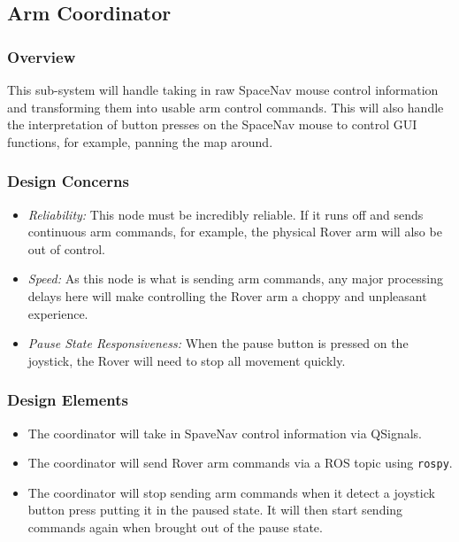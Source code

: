 \subsection{Arm Coordinator}
\subsubsection{Overview}
This sub-system will handle taking in raw SpaceNav mouse control information and transforming them into usable arm control commands.
This will also handle the interpretation of button presses on the SpaceNav mouse to control GUI functions, for example, panning the map around.

\subsubsection{Design Concerns}
\begin{itemize}
\item \textit{Reliability:} This node must be incredibly reliable.
If it runs off and sends continuous arm commands, for example, the physical Rover arm will also be out of control.
\item \textit{Speed:} As this node is what is sending arm commands, any major processing delays here will make controlling the Rover arm a choppy and unpleasant experience.
\item \textit{Pause State Responsiveness:} When the pause button is pressed on the joystick, the Rover will need to stop all movement quickly.
\end{itemize}

\subsubsection{Design Elements}
\begin{itemize}
\item The coordinator will take in SpaveNav control information via QSignals.
\item The coordinator will send Rover arm commands via a ROS topic using \texttt{rospy}.
\item The coordinator will stop sending arm commands when it detect a joystick button press putting it in the paused state.
It will then start sending commands again when brought out of the pause state.
\end{itemize}

